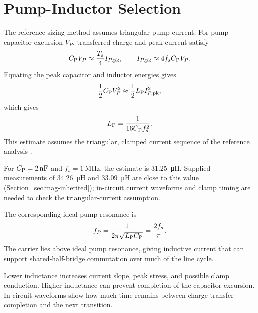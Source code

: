 \section{Pump-Inductor Selection}
\label{sec:analysis-lp}

The reference sizing method assumes triangular pump current. For pump-capacitor excursion \(V_P\), transferred charge and peak current satisfy
\begin{equation}
C_{\mathrm{P}} V_P\approx\frac{T_s}{4}I_{P,\mathrm{pk}},
\qquad I_{P,\mathrm{pk}}\approx4f_sC_{\mathrm{P}} V_P.
\label{eq:analysis-pump-current}
\end{equation}
Equating the peak capacitor and inductor energies gives
\begin{equation}
\frac{1}{2}C_{\mathrm{P}} V_P^2\approx\frac{1}{2}L_{\mathrm{P}} I_{P,\mathrm{pk}}^2,
\end{equation}
which gives
\begin{equation}
L_{\mathrm{P}}=\frac{1}{16C_{\mathrm{P}} f_s^2}.
\label{eq:lp-sizing}
\end{equation}
This estimate assumes the triangular, clamped current sequence of the reference analysis \cite{ammar2021led}.

For \(C_{\mathrm{P}}=\SI{2}{\nano\farad}\) and \(f_s=\SI{1}{\mega\hertz}\), the estimate is \SI{31.25}{\micro\henry}. Supplied measurements of \SI{34.26}{\micro\henry} and \SI{33.09}{\micro\henry} are close to this value (Section~\ref{sec:mag-inherited}); in-circuit current waveforms and clamp timing are needed to check the triangular-current assumption.

The corresponding ideal pump resonance is
\begin{equation}
f_P=\frac{1}{2\pi\sqrt{L_{\mathrm{P}}C_{\mathrm{P}}}}=\frac{2f_s}{\pi}.
\end{equation}
The carrier lies above ideal pump resonance, giving inductive current that can support shared-half-bridge commutation over much of the line cycle.

Lower inductance increases current slope, peak stress, and possible clamp conduction. Higher inductance can prevent completion of the capacitor excursion. In-circuit waveforms show how much time remains between charge-transfer completion and the next transition.
